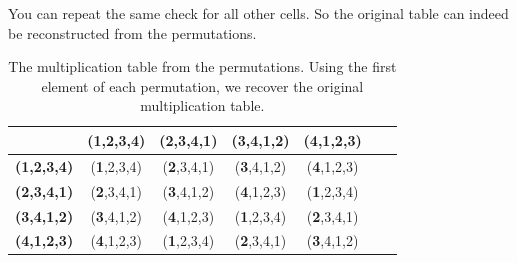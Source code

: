 You can repeat the same check for all other cells.
So the original table can indeed be reconstructed from the permutations.
\begin{table}[ht]
\centering
    \begin{tabular}{|c|c|c|c|c|c|c|}
    \hline
     & \textbf{(\textbf{1},2,3,4)} & \textbf{(\textbf{2},3,4,1)} & \textbf{(\textbf{3},4,1,2)} & \textbf{(\textbf{4},1,2,3)} \\
    \hline
    \textbf{(\textbf{1},2,3,4)} & (\textbf{1},2,3,4) & (\textbf{2},3,4,1) & (\textbf{3},4,1,2) & (\textbf{4},1,2,3) \\
    \hline
    \textbf{(\textbf{2},3,4,1)} & (\textbf{2},3,4,1) & (\textbf{3},4,1,2) & (\textbf{4},1,2,3) & (\textbf{1},2,3,4) \\
    \hline
    \textbf{(\textbf{3},4,1,2)} & (\textbf{3},4,1,2) & (\textbf{4},1,2,3) & (\textbf{1},2,3,4) & (\textbf{2},3,4,1) \\
    \hline
    \textbf{(\textbf{4},1,2,3)} & (\textbf{4},1,2,3) & (\textbf{1},2,3,4) & (\textbf{2},3,4,1) & (\textbf{3},4,1,2) \\
    \hline
    \end{tabular}
    \caption{The multiplication table from the permutations. Using 
    the first element of each permutation, we recover the original multiplication table.}
\end{table}


